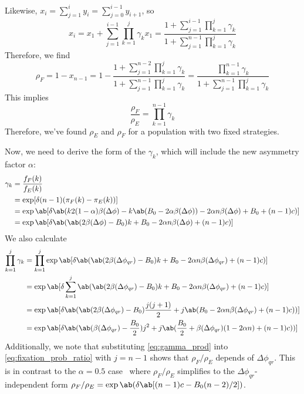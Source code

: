 Likewise, $x_i = \sum_{j=1}^i y_i = \sum_{j=0}^{i-1} y_{i+1}$, so
\begin{equation*}
  x_i
  = x_1 + \sum_{j=1}^{i-1} \prod_{k=1}^j \gamma_k x_1
  = \frac{1 + \sum_{j=1}^{i-1} \prod_{k=1}^j \gamma_k}
    {1 + \sum_{j=1}^{n-1} \prod_{k=1}^j \gamma_k}
\end{equation*}
Therefore, we find
\begin{equation*}
  \rho_F = 1 - x_{n-1}
  = 1 - \frac{1 + \sum_{j=1}^{n-2} \prod_{k=1}^j \gamma_k}
    {1 + \sum_{j=1}^{n-1} \prod_{k=1}^j \gamma_k}
  = \frac{\prod_{k=1}^{n-1} \gamma_k}{1 + \sum_{j=1}^{n-1} \prod_{k=1}^j \gamma_k}
\end{equation*}
This implies
\begin{equation}
  \frac{\rho_F}{\rho_E} = \prod_{k=1}^{n-1} \gamma_k
  \label{eq:fixation_prob_ratio}
\end{equation}
Therefore, we've found $\rho_E$ and $\rho_F$ for a population
with two fixed strategies.

Now, we need to derive the form of the $\gamma_k$,
which will include the new asymmetry factor $\alpha$:
\begin{align*}
  \gamma_k &= \frac{f_F(k)}{f_E(k)} \\
           &= \exp[\delta (n-1) (\pi_F(k) - \pi_E(k))]
           \\
           &= \exp\ab[\delta \ab(
    k 2 (1-\alpha) \beta(\Delta\phi)
    - k \ab(B_0 - 2 \alpha \beta(\Delta\phi))
                 - 2 \alpha n \beta(\Delta\phi) + B_0 + (n-1) c)] \\
      &= \exp\ab[\delta \ab(
    \ab(2 \beta(\Delta\phi) - B_0) k
                 + B_0 - 2 \alpha n \beta(\Delta\phi) + (n-1) c)]
\end{align*}
We also calculate
\begin{equation}
  \begin{aligned}
    \prod_{k=1}^j  \gamma_k
      &= \prod_{k=1}^j \exp\ab[\delta \ab(
      \ab(2 \beta(\Delta\phi_{qr}) - B_0) k
      + B_0 - 2 \alpha n \beta(\Delta\phi_{qr}) + (n-1) c)]
      \\
      &= \exp\ab[\delta \sum_{k=1}^j \ab(
      \ab(2 \beta(\Delta\phi_{qr}) - B_0) k
      + B_0 - 2 \alpha n \beta(\Delta\phi_{qr}) + (n-1) c)]
      \\
      &= \exp\ab[\delta \ab(
      \ab(2 \beta(\Delta\phi_{qr}) - B_0) \frac{j(j+1)}{2}
      + j \ab(B_0 - 2 \alpha n \beta(\Delta\phi_{qr}) + (n-1) c))]
      \\
      &= \exp\ab[\delta \ab(
      \ab(\beta(\Delta\phi_{qr}) - \frac{B_0}{2}) j^2
      + j \ab(\frac{B_0}{2} + \beta(\Delta\phi_{qr}) (1 - 2 \alpha n)  + (n-1) c))]
  \end{aligned}
  \label{eq:gamma_prod}
\end{equation}
Additionally, we note that substituting
\cref{eq:gamma_prod} into \cref{eq:fixation_prob_ratio}
with $j=n-1$ shows that $\rho_F/\rho_E$
depends of $\Delta \phi_{qr}$.
This is in contrast to the $\alpha=0.5$ case~\citep{tripp2022evolutionary}
where $\rho_F/\rho_E$ simplifies to the $\Delta \phi_{qr}$-independent form
$\rho_F/\rho_E = \exp \ab(\delta \ab[(n-1)c - B_0 (n-2)/2])$.

